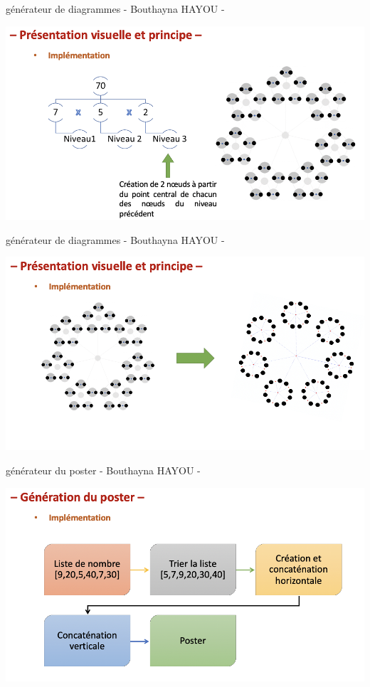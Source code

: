 \documentclass[aspectratio=169]{beamer}
\begin{document}
\begin{frame}[fragile=singleslide]{générateur de diagrammes \qquad \qquad \qquad - Bouthayna HAYOU -}
\begin{center}
    \includegraphics[width=13.5 cm]{./res/impl3.png}
\end{center}
\end{frame}

\begin{frame}[fragile=singleslide]{générateur de diagrammes \qquad \qquad \qquad - Bouthayna HAYOU -}
\begin{center}
    \includegraphics[width=14 cm]{./res/impl4.png}
\end{center}
\end{frame}

\begin{frame}[fragile=singleslide]{générateur du poster \qquad \qquad \qquad \qquad - Bouthayna HAYOU -}
\begin{center}
    \includegraphics[width=14 cm]{./res/post.png}
\end{center}
\end{frame}
\end{document}
